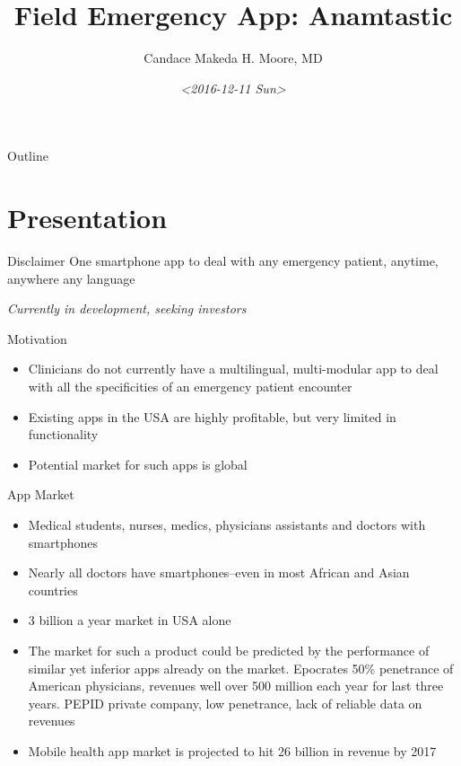 \documentclass[presentation]{beamer}
\author{Candace Makeda H. Moore, MD}
\date{\textit{<2016-12-11 Sun>}}
\title{Field Emergency App: Anamtastic}
\begin{document}
\maketitle
\begin{frame}{Outline}
\tableofcontents
\end{frame}


\section{Presentation}
\label{sec-1}
\begin{frame}[label=sec-1-0-1]{Disclaimer}
One smartphone app to deal with any emergency patient, anytime,
anywhere any language

\emph{Currently in development, seeking investors}
\end{frame}

\begin{frame}[label=sec-1-0-2]{Motivation}
\begin{itemize}
\item Clinicians do not currently have a multilingual, multi-modular
app to deal with all the specificities of an emergency patient
encounter
\item Existing apps in the USA are highly profitable, but very limited in
functionality
\item Potential market for such apps is global
\end{itemize}
\end{frame}

\begin{frame}[label=sec-1-0-3]{App Market}
\begin{itemize}
\item Medical students, nurses, medics, physicians assistants and doctors
with smartphones
\item Nearly all doctors have smartphones--even in most African and Asian
countries
\item 3 billion a year market in USA alone
\item The market for such a product could be predicted by the performance
of similar yet inferior apps already on the market.  \alert{Epocrates} 50\%
penetrance of American physicians, revenues well over 500 million
each year for last three years.  \alert{PEPID} private company, low
penetrance, lack of reliable data on revenues
\item Mobile health app market is projected to hit 26 billion in revenue
by 2017
\end{itemize}
\end{frame}
\end{document}
